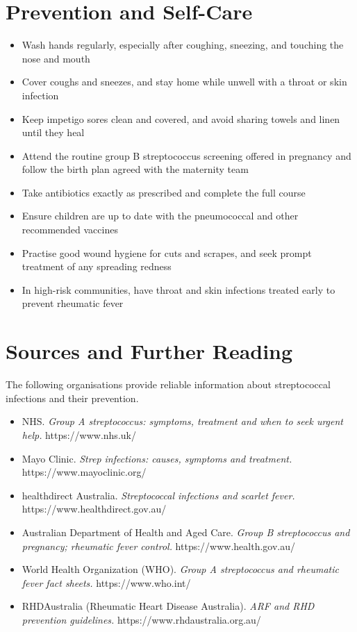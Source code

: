 \section*{Prevention and Self-Care}
\begin{itemize}
    \item Wash hands regularly, especially after coughing, sneezing, and touching the nose and mouth
    \item Cover coughs and sneezes, and stay home while unwell with a throat or skin infection
    \item Keep impetigo sores clean and covered, and avoid sharing towels and linen until they heal
    \item Attend the routine group B streptococcus screening offered in pregnancy and follow the birth plan agreed with the maternity team
    \item Take antibiotics exactly as prescribed and complete the full course
    \item Ensure children are up to date with the pneumococcal and other recommended vaccines
    \item Practise good wound hygiene for cuts and scrapes, and seek prompt treatment of any spreading redness
    \item In high-risk communities, have throat and skin infections treated early to prevent rheumatic fever
\end{itemize}

\section*{Sources and Further Reading}
The following organisations provide reliable information about streptococcal infections and their prevention.

\begin{itemize}
    \item NHS. \textit{Group A streptococcus: symptoms, treatment and when to seek urgent help.} https://www.nhs.uk/
    \item Mayo Clinic. \textit{Strep infections: causes, symptoms and treatment.} https://www.mayoclinic.org/
    \item healthdirect Australia. \textit{Streptococcal infections and scarlet fever.} https://www.healthdirect.gov.au/
    \item Australian Department of Health and Aged Care. \textit{Group B streptococcus and pregnancy; rheumatic fever control.} https://www.health.gov.au/
    \item World Health Organization (WHO). \textit{Group A streptococcus and rheumatic fever fact sheets.} https://www.who.int/
    \item RHDAustralia (Rheumatic Heart Disease Australia). \textit{ARF and RHD prevention guidelines.} https://www.rhdaustralia.org.au/
\end{itemize}

\clearpage
